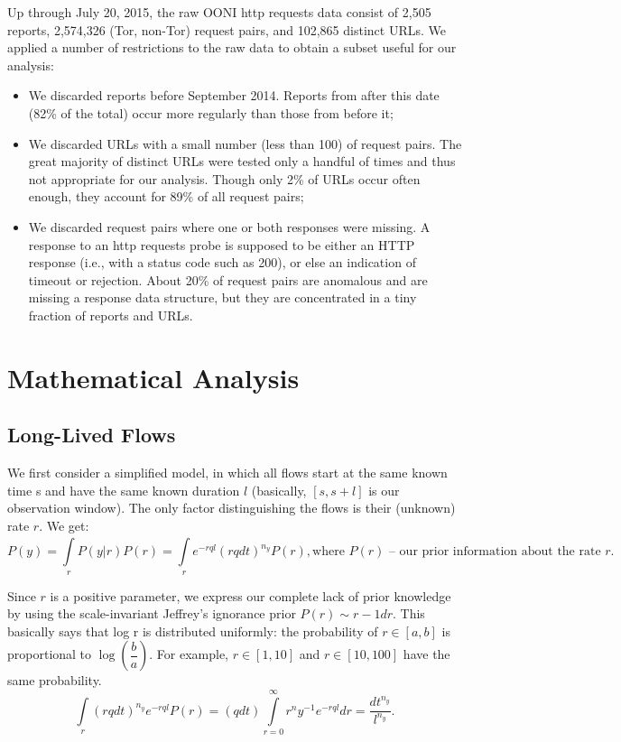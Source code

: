 \documentclass[12pt]{spieman}
\begin{document}
\begin{spacing}{2}
Up through July 20, 2015, the raw OONI http requests data consist of 2,505 reports, 2,574,326 (Tor, non-Tor) request pairs, and 102,865 distinct URLs. We applied a number of restrictions to the raw data to obtain a subset useful for our analysis:
\begin{itemize}
\item We discarded reports before September 2014. Reports from after this date (82\% of the total) occur more regularly than those from before it;
\item We discarded URLs with a small number (less than 100) of request pairs. The great majority of distinct URLs were tested only a handful of times and thus not appropriate for our analysis. Though only 2\% of URLs occur often enough, they account for 89\% of all request pairs;
\item We discarded request pairs where one or both responses were missing. A response to an http requests probe is supposed to be either an HTTP response (i.e., with a status code such as 200), or else an indication of timeout or rejection. About 20\% of request pairs are anomalous and are missing a response data structure, but they are concentrated in a tiny fraction of reports and URLs.
\end{itemize}

\section{Mathematical Analysis}
\subsection{Long-Lived Flows}
We first consider a simplified model, in which all flows start at the same known time s and have the same known duration $l$ (basically, $[s,s+l]$ is our observation window). The only factor distinguishing the flows is their (unknown) rate $r$. We get:
\begin{equation}
\label{1}
P(y) = \int\limits_{r}^{} P(y|r)P(r)= \int\limits_{r}^{} e^{-rql} (rq dt)^{n_{y}}P(r), \text{where } P(r) \text{  – our prior information about the rate } r.
\end{equation}

Since $r$ is a positive parameter, we express our complete lack of prior knowledge by using the scale-invariant Jeffrey’s ignorance prior $P(r) 
\sim r -1 dr$. This basically says that log r is distributed uniformly: the probability of $r \in [a,b]$ is proportional to $\log\left(\dfrac{b}{a}\right)$. For example, $r \in [1,10]$ and $r \in [10,100]$ have the same probability.
\begin{equation}
\label{2}
\int\limits_{r}^{} (rq dt)^{n_{y}} e^{-rql} P(r) = (q dt) \int\limits_{r=0}^{\infty} r^{n} y^{-1} e^{-rql} dr = \frac{dt^{n_{y}}}{l^{n_{y}}}.
\end{equation}


\end{spacing}
\end{document}
